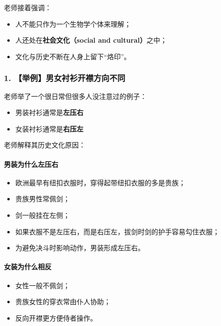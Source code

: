 \documentclass[
  chinese,
  9pt,
  a4paper,
]{ctexart}
\providecommand{\tightlist}{%
  \setlength{\itemsep}{0pt}\setlength{\parskip}{0pt}}
\begin{document}
老师接着强调：

\begin{itemize}
\tightlist
\item
  人不能只作为一个生物学个体来理解；
\item
  人还处在\textbf{社会文化（social and cultural）}之中；
\item
  文化与历史不断在人身上留下``烙印''。
\end{itemize}

\subsubsection{1.
【举例】男女衬衫开襟方向不同}\label{ux4e3eux4f8bux7537ux5973ux886cux886bux5f00ux895fux65b9ux5411ux4e0dux540c}

老师举了一个很日常但很多人没注意过的例子：

\begin{itemize}
\tightlist
\item
  男装衬衫通常是\textbf{左压右}
\item
  女装衬衫通常是\textbf{右压左}
\end{itemize}

老师解释其历史文化原因：

\paragraph{男装为什么左压右}\label{ux7537ux88c5ux4e3aux4ec0ux4e48ux5de6ux538bux53f3}

\begin{itemize}
\tightlist
\item
  欧洲最早有纽扣衣服时，穿得起带纽扣衣服的多是贵族；
\item
  贵族男性常佩剑；
\item
  剑一般挂在左侧；
\item
  如果衣服不是左压右，而是右压左，拔剑时剑的护手容易勾住衣服；
\item
  为避免决斗时影响动作，男装形成左压右。
\end{itemize}

\paragraph{女装为什么相反}\label{ux5973ux88c5ux4e3aux4ec0ux4e48ux76f8ux53cd}

\begin{itemize}
\tightlist
\item
  女性一般不佩剑；
\item
  贵族女性的穿衣常由仆人协助；
\item
  反向开襟更方便侍者操作。
\end{itemize}
\end{document}

